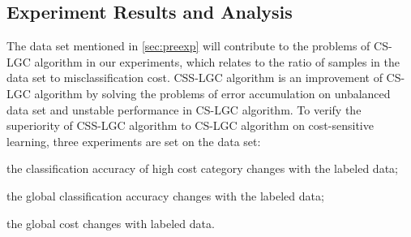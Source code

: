 \documentclass{svjour3}                     %
\begin{document}


\subsection{Experiment Results and Analysis}

The data set mentioned in \ref{sec:preexp} will contribute to the problems of CS-LGC algorithm in our experiments, which relates to the ratio of samples in the data set to misclassification cost. CSS-LGC algorithm is an improvement of CS-LGC algorithm by solving the problems of error accumulation on unbalanced data set and unstable performance in CS-LGC algorithm. To verify the superiority of CSS-LGC algorithm to CS-LGC algorithm on cost-sensitive learning, three experiments are set on the data set:
\begin{inparaenum}[(1)]
  \item the classification accuracy of high cost category changes with the labeled data;
  \item the global classification accuracy changes with the labeled data;
  \item the global cost changes with labeled data.
\end{inparaenum}
\end{document}
